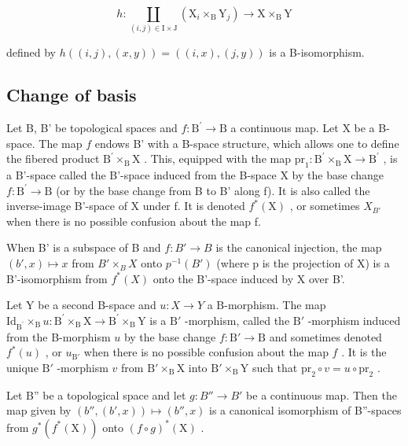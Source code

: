 \[
h \colon \coprod_ {(i, j) \in \mathrm{I} \times \mathrm{J}} (\mathrm{X} _ {i} \times_ {\mathrm{B}} \mathrm{Y} _ {j}) \to \mathrm{X} \times_ {\mathrm{B}} \mathrm{Y}
\]

defined by \(h((i,j),(x,y)) = ((i,x),(j,y))\) is a B-isomorphism.

\subsection{Change of basis}

Let B, B' be topological spaces and \(f\colon\mathrm{B}^{\prime}\to\mathrm{B}\) a continuous map. Let X be a B-space. The map \(f\) endows B' with a B-space structure, which allows one to define the fibered product \(\mathrm{B}^{\prime}\times_{\mathrm{B}}\mathrm{X}\) . This, equipped with the map \(\mathrm{pr}_{1}\colon\mathrm{B}^{\prime}\times_{\mathrm{B}}\mathrm{X}\to\mathrm{B}^{\prime}\) , is a B'-space called the B'-space induced from the B-space X by the base change \(f\colon\mathrm{B}^{\prime}\to\mathrm{B}\) (or by the base change from B to B' along f). It is also called the inverse-image B'-space of X under f. It is denoted \(f^{*}(\mathrm{X})\) , or sometimes \(X_{B'}\) when there is no possible confusion about the map f.

When B' is a subspace of B and \(f: B' \to B\) is the canonical injection, the map \((b', x) \mapsto x\) from \(B' \times_{B} X\) onto \(p^{-1}(B')\) (where p is the projection of X) is a B'-isomorphism from \(f^{*}(X)\) onto the B'-space induced by X over B'.

Let Y be a second B-space and \(u\colon X\to Y\) a B-morphism. The map \(\mathrm{Id}_{\mathrm{B}^{\prime}}\times_{\mathrm{B}}u\colon \mathrm{B}^{\prime}\times_{\mathrm{B}}\mathrm{X}\to \mathrm{B}^{\prime}\times_{\mathrm{B}}\mathrm{Y}\) is a \(\mathrm{B}'\) -morphism, called the \(\mathrm{B}'\) -morphism induced from the B-morphism \(u\) by the base change \(f\colon \mathrm{B}'\to \mathrm{B}\) and sometimes denoted \(f^{*}(u)\) , or \(u_{\mathrm{B}'}\) when there is no possible confusion about the map \(f\) . It is the unique \(\mathrm{B}'\) -morphism \(v\) from \(\mathrm{B}'\times_{\mathrm{B}}\mathrm{X}\) into \(\mathrm{B}'\times_{\mathrm{B}}\mathrm{Y}\) such that \(\mathrm{pr}_2\circ v = u\circ \mathrm{pr}_2\) .

Let B'' be a topological space and let \(g: B'' \to B'\) be a continuous map. Then the map given by \((b'', (b', x)) \mapsto (b'', x)\) is a canonical isomorphism of B''-spaces from \(g^{*}(f^{*}(\mathrm{X}))\) onto \((f \circ g)^{*}(\mathrm{X})\) .

